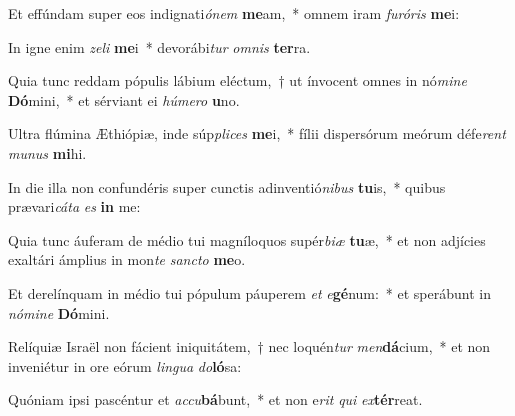\item Et effúndam super eos indignati\textit{ó}\textit{nem} \textbf{me}am,~* omnem iram \textit{fu}\textit{ró}\textit{ris} \textbf{me}i:
\item In igne enim \textit{ze}\textit{li} \textbf{me}i~* devorábi\textit{tur} \textit{om}\textit{nis} \textbf{ter}ra.
\item Quia tunc reddam pópulis lábium eléctum,~† ut ínvocent omnes in nó\textit{mi}\textit{ne} \textbf{Dó}mini,~* et sérviant ei \textit{hú}\textit{me}\textit{ro} \textbf{u}no.
\item Ultra flúmina Æthiópiæ, inde súp\textit{pli}\textit{ces} \textbf{me}i,~* fílii dispersórum meórum défe\textit{rent} \textit{mu}\textit{nus} \textbf{mi}hi.
\item In die illa non confundéris super cunctis adinventió\textit{ni}\textit{bus} \textbf{tu}is,~* quibus prævari\textit{cá}\textit{ta} \textit{es} \textbf{in} me:
\item Quia tunc áuferam de médio tui magníloquos supér\textit{bi}\textit{æ} \textbf{tu}æ,~* et non adjícies exaltári ámplius in mon\textit{te} \textit{sanc}\textit{to} \textbf{me}o.
\item Et derelínquam in médio tui pópulum páuperem \textit{et} \textit{e}\textbf{gé}num:~* et sperábunt in \textit{nó}\textit{mi}\textit{ne} \textbf{Dó}mini.
\item Relíquiæ Israël non fácient iniquitátem,~† nec loquén\textit{tur} \textit{men}\textbf{dá}cium,~* et non inveniétur in ore eórum \textit{lin}\textit{gua} \textit{do}\textbf{ló}sa:
\item Quóniam ipsi pascéntur et \textit{ac}\textit{cu}\textbf{bá}bunt,~* et non e\textit{rit} \textit{qui} \textit{ex}\textbf{tér}reat.
